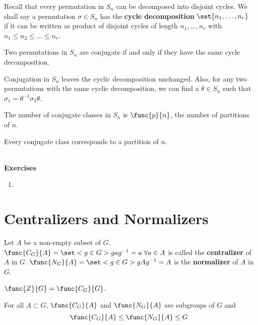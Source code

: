 Recall that every permutation in \(S_n\) can be decomposed into disjoint cycles. We shall say a permutation \(\sigma \in S_n\) has the \textbf{cycle decomposition} \(\set{n_1, \dots , n_r}\) if it can be written as product of disjoint cycles of length \(n_1, \dots ,n _r\) with \(n_1 \leq n_2 \leq \dots \leq n_r\).

\begin{lemma}
    Two permutations in \(S_n\) are conjugate if and only if they have the same cycle decomposition.
\end{lemma}

\begin{prooflemma}
    Conjugation in \(S_n\) leaves the cyclic decomposition unchanged. Also, for any two permutations with the same cyclic decomposition, we can find a \(\theta \in S_n\) such that \(\sigma_1 = \theta^{-1} \sigma_2 \theta\).
\end{prooflemma}
\begin{corollary}
    The number of conjugate classes in \(S_n\) is \(\func{p}{n}\), the number of partitions of \(n\).
\end{corollary}
\begin{prooflemma}
    Every conjugate class corresponds to a partition of \(n\).
\end{prooflemma}

\ \\ 
{\Large{\textbf{Exercises}}}
\begin{enumerate}
    \item 
\end{enumerate}
\section{Centralizers and Normalizers}
\begin{definition}
    Let \(A\) be a non-empty subset of \(G\). \(\func{C_G}{A} = \set<g \in G>{gag^{-1} = a \; \forall a \in A}\) is called the \textbf{centralizer} of \(A\) in \(G\). \(\func{N_G}{A} = \set<g \in G>{gAg^{-1} = A}\) is the \textbf{normalizer} of \(A\) in \(G\). 
\end{definition}
\begin{example}
    \(\func{Z}{G} = \func{C_G}{G}\). 
\end{example}

\begin{proposition}
    For all \(A \subset G\), \(\func{C_G}{A}\) and \(\func{N_G}{A}\) are subgroups of \(G\) and 
    \begin{equation*}
        \func{C_G}{A} \leq \func{N_G}{A} \leq G
    \end{equation*}
\end{proposition}

